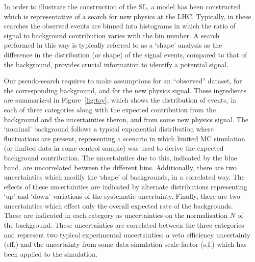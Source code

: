 \documentclass[11pt]{article}
\begin{document}
In order to illustrate the construction of the SL, a model has been constructed which is representative of a search for new physics at the LHC. Typically, in these searches the observed events are binned into histograms in which the ratio of signal to background contribution varies with the bin number. A search performed in this way is typically referred to as a `shape' analysis as the difference in the distribution (or shape) of the signal events, compared to that of the background, provides crucial information to identify a potential signal.


Our pseudo-search requires to make  assumptions for an ``observed'' dataset, for the corresponding background, and for the new physics signal.  These ingredients are summarized in Figure~\ref{fig:toy}, %
which shows the distribution of events, in each of three categories along with the expected contribution from the background %
and the uncertainties theron, 
and from some new physics signal.
The `nominal' background follows a typical exponential distribution where fluctuations are present, representing a scenario in which limited MC  simulation (or limited data in some control sample) was used
to derive the expected background contribution. The uncertainties due to this, indicated by the blue band, are uncorrelated between the different bins. Additionally, there are two uncertainties which modify the `shape' of
backgrounds, in a correlated way. The effects of these uncertainties are indicated by alternate distributions representing `up' and `down' variations of the systematic uncertainty. Finally, there are two uncertainties
which effect only the overall expected rate of the backgrounds. These are indicated in each category as uncertainties on the normalisation $N$ of the background. These uncertainties are correlated between the three categories
and represent two typical experimental uncertainties; a veto efficiency uncertainty (eff.) and the uncertainty from some data-simulation scale-factor (s.f.) which has been applied to the simulation.
\end{document}
